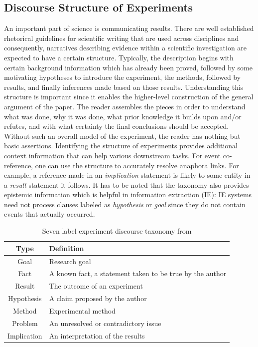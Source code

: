 \subsection{Discourse Structure of Experiments}
An important part of science is communicating results. There are well established rhetorical guidelines 
\cite{michael1996craft} for scientific writing that are used across disciplines and consequently, narratives describing
evidence within a scientific investigation are expected to have a certain structure. Typically, the description begins with certain background 
information which has already been proved, 
followed by some motivating hypotheses to introduce the experiment, the methods, followed by results, and finally
inferences made based on those results. Understanding this structure is important since it enables the 
higher-level construction of the general argument of the paper. The reader assembles the pieces in order to
understand what was done, why it was done, what prior knowledge it builds upon and/or refutes, and with what 
certainty the final conclusions should be accepted. Without such an overall model of the experiment, 
the reader has nothing but basic assertions. Identifying the structure of experiments provides
additional context information that can help various downstream tasks. For event
co-reference, 
one can use the structure to accurately resolve anaphora links. For example, a
reference made in an \textit{implication} statement is likely to some entity in
a \textit{result} 
statement it follows. It has to be noted that the taxonomy also provides
epistemic information which is helpful in information extraction (IE): IE
systems need not process
clauses labeled as \textit{hypothesis} or \textit{goal} since they do not
contain events that actually occurred.
\begin{table}
\begin{center}
  \begin{tabular}[c]{|c|l|}
 \hline
  \textbf{Type} & \textbf{Definition} \\
  \hline
  Goal & Research goal \\
  \hline
  Fact & A known fact, a statement taken to be true by the author \\
  \hline
  Result & The outcome of an experiment \\
  \hline
  Hypothesis & A claim proposed by the author \\
  \hline
  Method & Experimental method \\
  \hline
  Problem & An unresolved or contradictory issue \\
  \hline
  Implication & An interpretation of the results \\
  \hline
  \end{tabular}
\end{center}
 \caption{Seven label experiment discourse taxonomy from \protect\cite{de2012verb}}
 \label{table:taxonomy}
\end{table}

